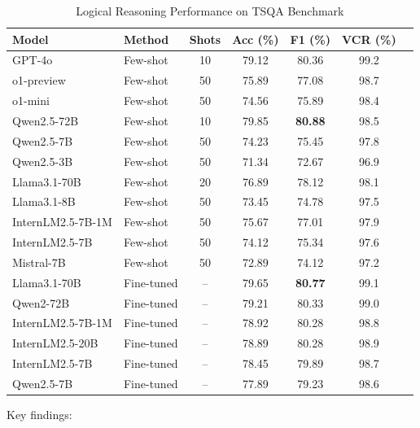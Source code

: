 \begin{table}[htbp]
\centering
\caption{Logical Reasoning Performance on TSQA Benchmark}
\label{tab:reasoning_results}
\begin{tabular}{@{}llccccc@{}}
\toprule
\textbf{Model} & \textbf{Method} & \textbf{Shots} & \textbf{Acc (\%)} & \textbf{F1 (\%)} & \textbf{VCR (\%)} \\
\midrule
GPT-4o & Few-shot & 10 & 79.12 & 80.36 & 99.2 \\
o1-preview & Few-shot & 50 & 75.89 & 77.08 & 98.7 \\
o1-mini & Few-shot & 50 & 74.56 & 75.89 & 98.4 \\
Qwen2.5-72B & Few-shot & 10 & 79.85 & \textbf{80.88} & 98.5 \\
Qwen2.5-7B & Few-shot & 50 & 74.23 & 75.45 & 97.8 \\
Qwen2.5-3B & Few-shot & 50 & 71.34 & 72.67 & 96.9 \\
Llama3.1-70B & Few-shot & 20 & 76.89 & 78.12 & 98.1 \\
Llama3.1-8B & Few-shot & 50 & 73.45 & 74.78 & 97.5 \\
InternLM2.5-7B-1M & Few-shot & 50 & 75.67 & 77.01 & 97.9 \\
InternLM2.5-7B & Few-shot & 50 & 74.12 & 75.34 & 97.6 \\
Mistral-7B & Few-shot & 50 & 72.89 & 74.12 & 97.2 \\
\midrule
Llama3.1-70B & Fine-tuned & -- & 79.65 & \textbf{80.77} & 99.1 \\
Qwen2-72B & Fine-tuned & -- & 79.21 & 80.33 & 99.0 \\
InternLM2.5-7B-1M & Fine-tuned & -- & 78.92 & 80.28 & 98.8 \\
InternLM2.5-20B & Fine-tuned & -- & 78.89 & 80.28 & 98.9 \\
InternLM2.5-7B & Fine-tuned & -- & 78.45 & 79.89 & 98.7 \\
Qwen2.5-7B & Fine-tuned & -- & 77.89 & 79.23 & 98.6 \\
\bottomrule
\end{tabular}
\end{table}

Key findings:

